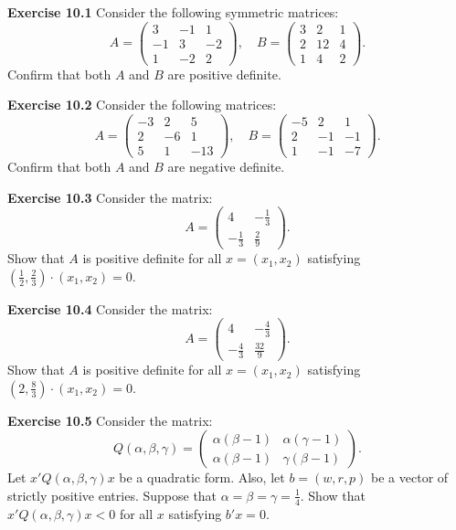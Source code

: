 \begin{original}
\textbf{Exercise 10.1} Consider the following symmetric matrices:
\[
A = \begin{pmatrix} 3 & -1 & 1 \\ -1 & 3 & -2 \\ 1 & -2 & 2 \end{pmatrix}, \quad
B = \begin{pmatrix} 3 & 2 & 1 \\ 2 & 12 & 4 \\ 1 & 4 & 2 \end{pmatrix}.
\]
Confirm that both $A$ and $B$ are positive definite.

\textbf{Exercise 10.2} Consider the following matrices:
\[
A = \begin{pmatrix} -3 & 2 & 5 \\ 2 & -6 & 1 \\ 5 & 1 & -13 \end{pmatrix}, \quad
B = \begin{pmatrix} -5 & 2 & 1 \\ 2 & -1 & -1 \\ 1 & -1 & -7 \end{pmatrix}.
\]
Confirm that both $A$ and $B$ are negative definite.

\textbf{Exercise 10.3} Consider the matrix:
\[
A = \begin{pmatrix} 4 & -\frac{1}{3} \\ -\frac{1}{3} & \frac{2}{9} \end{pmatrix}.
\]
Show that $A$ is positive definite for all $x = (x_1, x_2)$ satisfying $(\frac{1}{2}, \frac{2}{3}) \cdot (x_1, x_2) = 0$.

\textbf{Exercise 10.4} Consider the matrix:
\[
A = \begin{pmatrix} 4 & -\frac{4}{3} \\ -\frac{4}{3} & \frac{32}{9} \end{pmatrix}.
\]
Show that $A$ is positive definite for all $x = (x_1, x_2)$ satisfying $(2, \frac{8}{3}) \cdot (x_1, x_2) = 0$.

\textbf{Exercise 10.5} Consider the matrix:
\[
Q(\alpha, \beta, \gamma) = \begin{pmatrix}
\alpha(\beta-1) & \alpha(\gamma-1) \\
\alpha(\beta-1) & \gamma(\beta-1)
\end{pmatrix}.
\]
Let $x'Q(\alpha,\beta,\gamma)x$ be a quadratic form. Also, let $b = (w, r, p)$ be a vector of strictly positive entries. Suppose that $\alpha = \beta = \gamma = \frac{1}{4}$. Show that $x'Q(\alpha,\beta,\gamma)x < 0$ for all $x$ satisfying $b'x = 0$.
\end{original}
